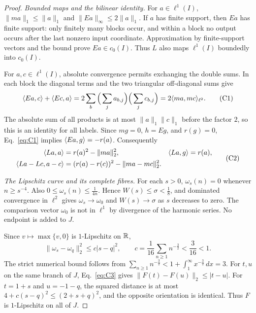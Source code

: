 \begin{proof}
\noindent\textit{Bounded maps and the bilinear identity.}
\label{sec:C1}
For $a\in\ell^1(I)$, $\|ma\|_1\le\|a\|_1$ and
$\|Ea\|_\infty\le2\|a\|_1$. If $a$ has finite support, then $Ea$ has
finite support: only finitely many blocks occur, and within a block no
output occurs after the last nonzero input coordinate. Approximation by
finite-support vectors and the bound prove $Ea\in c_0(I)$.
Thus $L$ also maps $\ell^1(I)$ boundedly into $c_0(I)$.

For $a,c\in\ell^1(I)$, absolute convergence permits exchanging the double
sums. In each block the diagonal terms and the two triangular
off-diagonal sums give
\begin{equation}
\langle Ea,c\rangle+\langle Ec,a\rangle
 =2\sum_b\Big(\sum_j a_{b,j}\Big)\Big(\sum_j c_{b,j}\Big)
 =2\langle ma,mc\rangle_{\ell^2}.
\tag{C1}\label{eq:C1}
\end{equation}
The absolute sum of all products is at most $\|a\|_1\|c\|_1$ before the
factor $2$, so this is an identity for all labels. Since $mg=0$, $h=Eg$,
and $r(g)=0$, Eq.~\eqref{eq:C1} implies $\langle Ea,g\rangle=-r(a)$.
Consequently
\begin{equation}
\begin{aligned}
\langle La,a\rangle&=r(a)^2-\|ma\|_2^2,&
\langle La,g\rangle&=r(a),\\
\langle La-Lc,a-c\rangle&=(r(a)-r(c))^2-\|ma-mc\|_2^2.
\end{aligned}
\tag{C2}\label{eq:C2}
\end{equation}

\noindent\textit{The Lipschitz curve and its complete fibres.}
\label{sec:C2}
For each $s>0$, $\omega_s(n)=0$ whenever $n\ge s^{-4}$. Also
$0\le\omega_s(n)\le\frac{1}{4n}$. Hence $W(s)\le\sigma<\frac{1}{8}$, and dominated
convergence in $\ell^2$ gives $\omega_s\to\omega_0$ and $W(s)\to\sigma$
as $s$ decreases to zero. The comparison vector $\omega_0$ is not in
$\ell^1$ by divergence of the harmonic series. No endpoint is added to $J$.

Since $v\mapsto\max\{v,0\}$ is $1$-Lipschitz on $\mathbb R$,
\begin{equation}
\|\omega_s-\omega_q\|_2^2\le c|s-q|^2,\qquad
c=\frac1{16}\sum_{n\ge1}n^{-\frac{3}{2}}<\frac3{16}<1.
\tag{C3}\label{eq:C3}
\end{equation}
The strict numerical bound follows from
$\sum_{n\ge1}n^{-\frac{3}{2}}<1+\int_1^\infty x^{-\frac{3}{2}}\,dx=3$.
For $t,u$ on the same branch of $J$, Eq.~\eqref{eq:C3} gives
$\|F(t)-F(u)\|_2\le|t-u|$. For $t=1+s$ and $u=-1-q$, the squared
distance is at most $4+c(s-q)^2\le(2+s+q)^2$, and the opposite
orientation is identical. Thus $F$ is $1$-Lipschitz on all of $J$.


\end{proof}
